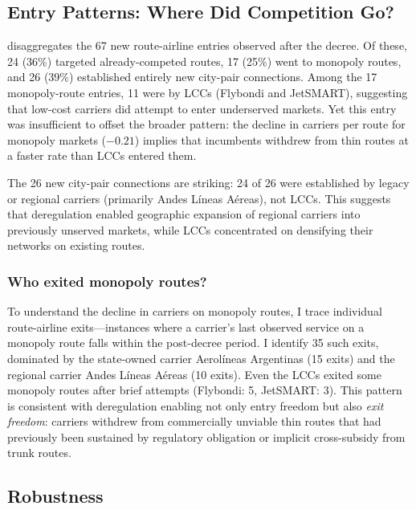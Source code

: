 \documentclass[12pt]{article}
\begin{document}
{\small}

\subsection{Entry Patterns: Where Did Competition Go?}

 disaggregates the 67 new route-airline entries observed after the decree. Of these, 24 (36\%) targeted already-competed routes, 17 (25\%) went to monopoly routes, and 26 (39\%) established entirely new city-pair connections. Among the 17 monopoly-route entries, 11 were by LCCs (Flybondi and JetSMART), suggesting that low-cost carriers did attempt to enter underserved markets. Yet this entry was insufficient to offset the broader pattern: the decline in carriers per route for monopoly markets ($-0.21$) implies that incumbents withdrew from thin routes at a faster rate than LCCs entered them.



The 26 new city-pair connections are striking: 24 of 26 were established by legacy or regional carriers (primarily Andes L\'{i}neas A\'{e}reas), not LCCs. This suggests that deregulation enabled geographic expansion of regional carriers into previously unserved markets, while LCCs concentrated on densifying their networks on existing routes.

\subsubsection*{Who exited monopoly routes?} To understand the decline in carriers on monopoly routes, I trace individual route-airline exits---instances where a carrier's last observed service on a monopoly route falls within the post-decree period. I identify 35 such exits, dominated by the state-owned carrier Aerol\'{i}neas Argentinas (15 exits) and the regional carrier Andes L\'{i}neas A\'{e}reas (10 exits). Even the LCCs exited some monopoly routes after brief attempts (Flybondi: 5, JetSMART: 3). This pattern is consistent with deregulation enabling not only entry freedom but also \textit{exit freedom}: carriers withdrew from commercially unviable thin routes that had previously been sustained by regulatory obligation or implicit cross-subsidy from trunk routes.

\subsection{Robustness}
\end{document}
